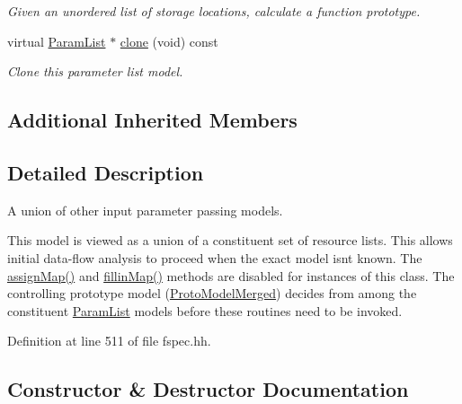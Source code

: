 \begin{DoxyCompactItemize}
\begin{DoxyCompactList}\small\item\em Given an unordered list of storage locations, calculate a function prototype. \end{DoxyCompactList}\item 
virtual \mbox{\hyperlink{class_param_list}{Param\+List}} $\ast$ \mbox{\hyperlink{class_param_list_merged_a98c49178195f02a964dd87b9e8fcddfa}{clone}} (void) const
\begin{DoxyCompactList}\small\item\em Clone this parameter list model. \end{DoxyCompactList}\end{DoxyCompactItemize}
\subsection*{Additional Inherited Members}


\subsection{Detailed Description}
A union of other input parameter passing models. 

This model is viewed as a union of a constituent set of resource lists. This allows initial data-\/flow analysis to proceed when the exact model isn\textquotesingle{}t known. The \mbox{\hyperlink{class_param_list_merged_a54e5b3089383a5d80efbd23791992e4b}{assign\+Map()}} and \mbox{\hyperlink{class_param_list_merged_aa4252b6768505e059edfe83ebdbf2065}{fillin\+Map()}} methods are disabled for instances of this class. The controlling prototype model (\mbox{\hyperlink{class_proto_model_merged}{Proto\+Model\+Merged}}) decides from among the constituent \mbox{\hyperlink{class_param_list}{Param\+List}} models before these routines need to be invoked. 

Definition at line 511 of file fspec.\+hh.



\subsection{Constructor \& Destructor Documentation}
\mbox{\label{class_param_list_merged_a5b9e6c47a1d11673ab94fedd7bce15ba}} 
